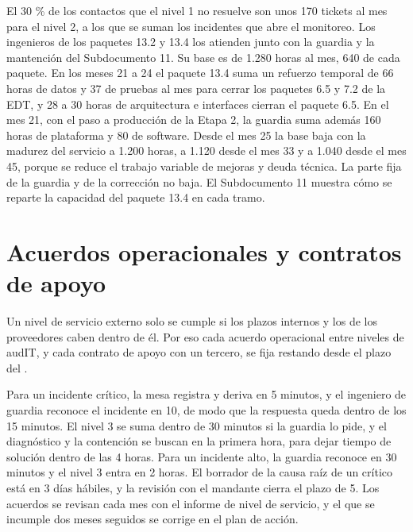 El 30 \% de los contactos que el nivel 1 no resuelve son unos 170 tickets al mes para el nivel 2, a los
que se suman los incidentes que abre el monitoreo. Los ingenieros de los paquetes 13.2 y 13.4 los
atienden junto con la guardia y la mantención del Subdocumento 11. Su base es de 1.280 horas al mes, 640
de cada paquete. En los meses 21 a 24 el paquete 13.4 suma un refuerzo temporal de 66 horas de datos y
37 de pruebas al mes para cerrar los paquetes 6.5 y 7.2 de la EDT, y 28 a 30 horas de arquitectura e
interfaces cierran el paquete 6.5. En el mes 21, con el paso a producción de la Etapa 2, la guardia suma
además 160 horas de plataforma y 80 de software. Desde el mes 25 la base baja con la madurez del
servicio a 1.200 horas, a 1.120 desde el mes 33 y a 1.040 desde el mes 45, porque se reduce el trabajo
variable de mejoras y deuda técnica. La parte fija de la guardia y de la corrección no baja. El
Subdocumento 11 muestra cómo se reparte la capacidad del paquete 13.4 en cada tramo.

\section{Acuerdos operacionales y contratos de apoyo}\label{sec:10-acuerdos-operacionales-y-contrat}

Un nivel de servicio externo solo se cumple si los plazos internos y los de los proveedores caben dentro
de él. Por eso cada acuerdo operacional entre niveles de audIT, y cada contrato de apoyo con un tercero,
se fija restando desde el plazo del .

Para un incidente crítico, la mesa registra y deriva en 5 minutos, y el ingeniero de guardia reconoce el
incidente en 10, de modo que la respuesta queda dentro de los 15 minutos. El nivel 3 se suma dentro de
30 minutos si la guardia lo pide, y el diagnóstico y la contención se buscan en la primera hora, para
dejar tiempo de solución dentro de las 4 horas. Para un incidente alto, la guardia reconoce en 30
minutos y el nivel 3 entra en 2 horas. El borrador de la causa raíz de un crítico está en 3 días hábiles,
y la revisión con el mandante cierra el plazo de 5. Los acuerdos se revisan cada mes con el informe de
nivel de servicio, y el que se incumple dos meses seguidos se corrige en el plan de acción.


